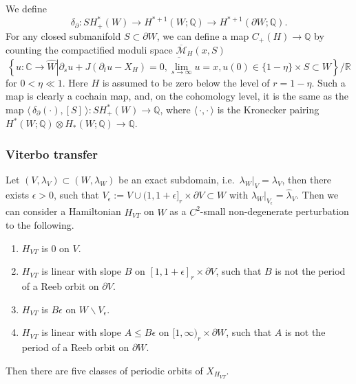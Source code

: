 \documentclass[reqno,11pt]{amsart}
\numberwithin{equation}{section}
\def\R{\mathbb{R}}
\def\C{{\mathbb C}}
\def\Q{{\mathbb Q}}
\def\cM{{\mathcal M}}
\def\la{\langle\,}
\def\ra{\,\rangle}
\begin{document}
We define 
$$\delta_{\partial}:SH_+^{*}(W)\to H^{*+1}(W;\Q)\to H^{*+1}(\partial W;\Q).$$
For any closed submanifold $S\subset \partial W$, we can define a map $C_+(H)\to \Q$ by counting the compactified moduli space  $\overline{\cM}_H(x,S)$
$$\overline{\left\{ u:\C\to \widehat{W}\left|\partial_su+J(\partial_tu-X_H)=0, \lim_{s\to \infty} u = x, u(0)\in \{1-\eta\} \times S \subset W  \right.\right\}/\R}$$
for $0<\eta \ll 1$. Here $H$ is assumed to be zero below the level of $r=1-\eta$. Such a map is clearly a cochain map, and, on the cohomology level, it is the same as the map $\la \delta_{\partial}(\cdot),[S]\ra:SH_+^*(W)\to \Q$, where $\la \cdot, \cdot\ra$ is the Kronecker pairing $H^*(W;\Q)\otimes H_*(W;\Q)\to \Q$. 

\subsubsection{Viterbo transfer}
Let $(V,\lambda_V)\subset (W,\lambda_W)$ be an exact subdomain, i.e.\ $\lambda_W|_V=\lambda_V$, then there exists $\epsilon>0$, such that $V_{\epsilon}:=V\cup  (1,1+\epsilon]_r\times \partial V \subset W$ with $\lambda_W|_{V_{\epsilon}}=\widehat{\lambda}_V$. Then we can consider a Hamiltonian $H_{VT}$ on $\widehat{W}$ as a $C^2$-small non-degenerate perturbation to the following.
\begin{enumerate}
	\item $H_{VT}$ is $0$ on $V$.
	\item $H_{VT}$ is linear with slope $B$ on $[1,1+\epsilon]_r\times \partial V$, such that $B$ is not the period of a Reeb orbit on $\partial V$.
	\item $H_{VT}$ is $B\epsilon$ on $W\backslash V_{\epsilon}$.
	\item $H_{VT}$ is linear with slope $A\le B\epsilon$ on $[1,\infty)_r\times \partial W$, such that $A$ is not the period of a Reeb orbit on $\partial W$.  
\end{enumerate}
Then there are five classes of periodic orbits of $X_{H_{VT}}$.
\end{document}
